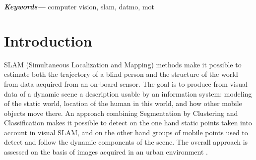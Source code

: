 \documentclass[conference,compsoc]{IEEEtran}
\providecommand{\keywords}[1]
{
  \small	
  \textbf{\textit{Keywords---}} #1
}
\begin{document}
\keywords{computer vision, slam, datmo, mot}



%
\IEEEpeerreviewmaketitle



\section{Introduction}
SLAM (Simultaneous Localization and Mapping) \cite{mozos2007interest} methods make it possible to estimate both the trajectory of a blind person and the structure of the world from data acquired from an on-board sensor. The goal is to produce from visual data of a dynamic scene a description usable by an information system: modeling of the static world, location of the human in this world, and how other mobile objects move there. An approach combining Segmentation by Clustering and Classification makes it possible to detect on the one hand static points taken into account in visual SLAM, and on the other hand groups of mobile points used to detect and follow the dynamic components of the scene. The overall approach is assessed on the basis of images acquired in an urban environment \cite{gil2010comparative}.
\end{document}
